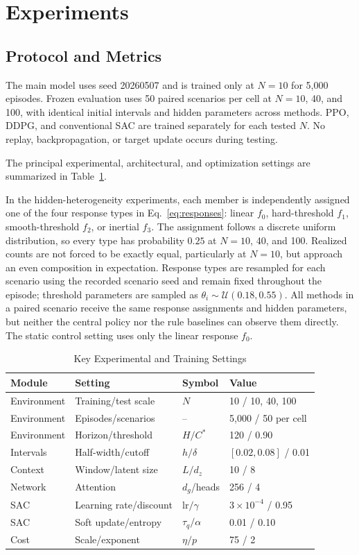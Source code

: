 \documentclass[journal]{IEEEtran}
\begin{document}
\section{Experiments}
\label{sec:experiments}

\subsection{Protocol and Metrics}

The main model uses seed 20260507 and is trained only at $N=10$ for 5,000 episodes. Frozen evaluation uses 50 paired scenarios per cell at $N=10$, 40, and 100, with identical initial intervals and hidden parameters across methods. PPO, DDPG, and conventional SAC are trained separately for each tested $N$. No replay, backpropagation, or target update occurs during testing.

The principal experimental, architectural, and optimization settings are summarized in Table~\ref{tab:settings}.

In the hidden-heterogeneity experiments, each member is independently assigned one of the four response types in Eq.~\eqref{eq:responses}: linear $f_0$, hard-threshold $f_1$, smooth-threshold $f_2$, or inertial $f_3$. The assignment follows a discrete uniform distribution, so every type has probability $0.25$ at $N=10$, 40, and 100. Realized counts are not forced to be exactly equal, particularly at $N=10$, but approach an even composition in expectation. Response types are resampled for each scenario using the recorded scenario seed and remain fixed throughout the episode; threshold parameters are sampled as $\theta_i\sim\mathcal U(0.18,0.55)$. All methods in a paired scenario receive the same response assignments and hidden parameters, but neither the central policy nor the rule baselines can observe them directly. The static control setting uses only the linear response $f_0$.

\begin{table}[!t]
\caption{Key Experimental and Training Settings}
\label{tab:settings}
\centering
\footnotesize
\setlength{\tabcolsep}{5pt}
\begin{tabular}{llll}
\toprule
Module & Setting & Symbol & Value \\
\midrule
Environment & Training/test scale & $N$ & 10 / 10, 40, 100 \\
Environment & Episodes/scenarios & -- & 5,000 / 50 per cell \\
Environment & Horizon/threshold & $H/C^*$ & 120 / 0.90 \\
Intervals & Half-width/cutoff & $h/\delta$ & $[0.02,0.08]$ / 0.01 \\
Context & Window/latent size & $L/d_z$ & 10 / 8 \\
Network & Attention & $d_g$/heads & 256 / 4 \\
SAC & Learning rate/discount & $\mathrm{lr}/\gamma$ & $3\times10^{-4}$ / 0.95 \\
SAC & Soft update/entropy & $\tau_q/\alpha$ & 0.01 / 0.10 \\
Cost & Scale/exponent & $\eta/p$ & 75 / 2 \\
\bottomrule
\end{tabular}
\end{table}
\end{document}
